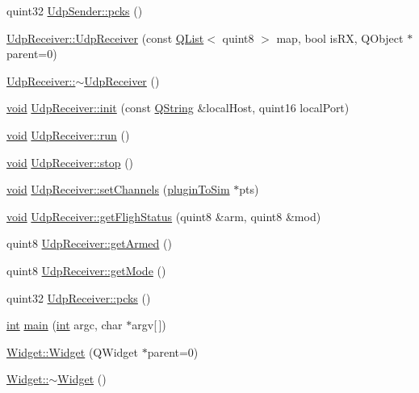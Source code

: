 \begin{DoxyCompactItemize}
\item 
quint32 \hyperlink{group___aero_sim_r_c_gaa06c6b62e9498dee34b35c225479a52a}{Udp\-Sender\-::pcks} ()
\item 
\hyperlink{group___aero_sim_r_c_ga1a7699c1e29a1d7ee129c5aeecc515c5}{Udp\-Receiver\-::\-Udp\-Receiver} (const \hyperlink{class_q_list}{Q\-List}$<$ quint8 $>$ map, bool is\-R\-X, Q\-Object $\ast$parent=0)
\item 
\hyperlink{group___aero_sim_r_c_ga7125fcfef5ec56da34e1f3f2afc21c57}{Udp\-Receiver\-::$\sim$\-Udp\-Receiver} ()
\item 
\hyperlink{group___u_a_v_objects_plugin_ga444cf2ff3f0ecbe028adce838d373f5c}{void} \hyperlink{group___aero_sim_r_c_gad45fd7a1310445a52d17f2fe3ec7ab4b}{Udp\-Receiver\-::init} (const \hyperlink{group___u_a_v_objects_plugin_gab9d252f49c333c94a72f97ce3105a32d}{Q\-String} \&local\-Host, quint16 local\-Port)
\item 
\hyperlink{group___u_a_v_objects_plugin_ga444cf2ff3f0ecbe028adce838d373f5c}{void} \hyperlink{group___aero_sim_r_c_gaa4efe37e6d2da77ba95eb22705c1f1e2}{Udp\-Receiver\-::run} ()
\item 
\hyperlink{group___u_a_v_objects_plugin_ga444cf2ff3f0ecbe028adce838d373f5c}{void} \hyperlink{group___aero_sim_r_c_ga6269b9d1dd9625c71d9749c343e6be17}{Udp\-Receiver\-::stop} ()
\item 
\hyperlink{group___u_a_v_objects_plugin_ga444cf2ff3f0ecbe028adce838d373f5c}{void} \hyperlink{group___aero_sim_r_c_gab9cfcf389004c47e3af049bcef67fed9}{Udp\-Receiver\-::set\-Channels} (\hyperlink{structplugin_to_sim}{plugin\-To\-Sim} $\ast$pts)
\item 
\hyperlink{group___u_a_v_objects_plugin_ga444cf2ff3f0ecbe028adce838d373f5c}{void} \hyperlink{group___aero_sim_r_c_ga7aa237515699baba97a4c3e76a55d401}{Udp\-Receiver\-::get\-Fligh\-Status} (quint8 \&arm, quint8 \&mod)
\item 
quint8 \hyperlink{group___aero_sim_r_c_gaf0d473076876c13ba7df05e9ba6fd322}{Udp\-Receiver\-::get\-Armed} ()
\item 
quint8 \hyperlink{group___aero_sim_r_c_gaf1ad345905414c2c6c8883cdba472aae}{Udp\-Receiver\-::get\-Mode} ()
\item 
quint32 \hyperlink{group___aero_sim_r_c_ga4b48a3aa9531a445286790d5859da129}{Udp\-Receiver\-::pcks} ()
\item 
\hyperlink{ioapi_8h_a787fa3cf048117ba7123753c1e74fcd6}{int} \hyperlink{group___aero_sim_r_c_ga0ddf1224851353fc92bfbff6f499fa97}{main} (\hyperlink{ioapi_8h_a787fa3cf048117ba7123753c1e74fcd6}{int} argc, char $\ast$argv\mbox{[}$\,$\mbox{]})
\item 
\hyperlink{group___aero_sim_r_c_ga29531c7f141e461322981b3b579d4590}{Widget\-::\-Widget} (Q\-Widget $\ast$parent=0)
\item 
\hyperlink{group___aero_sim_r_c_gaa24f66bcbaaec6d458b0980e8c8eae65}{Widget\-::$\sim$\-Widget} ()
\end{DoxyCompactItemize}
